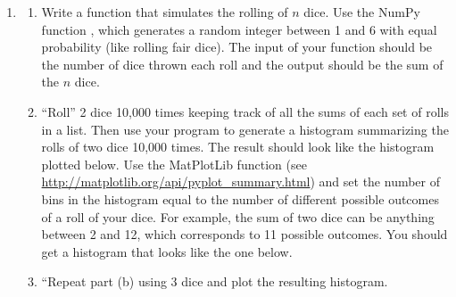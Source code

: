 \documentclass[letterpaper,10pt,english]{sphinxmanual}
\begin{document}
\begin{enumerate}
\item {} \begin{enumerate}
\item {} 
Write a function that simulates the rolling of \(n\) dice.  Use the NumPy function , which generates a random integer between 1 and 6 with equal probability (like rolling fair dice).  The input of your function should be the number of dice thrown each roll and the output should be the sum of the \(n\) dice.

\item {} 
``Roll'' 2 dice 10,000 times keeping track of all the sums of each set of rolls in a list.  Then use your program to generate a histogram  summarizing the rolls of two dice 10,000 times.  The result should look like the histogram plotted below.  Use the MatPlotLib function  (see \href{http://matplotlib.org/api/pyplot\_summary.html}{http://matplotlib.org/api/pyplot\_summary.html}) and set the number of bins in the histogram equal to the number of different possible outcomes of a roll of your dice.  For example, the sum of two dice can be anything between 2 and 12, which corresponds to 11 possible outcomes.  You should get a histogram that looks like the one below.

\item {} 
``Repeat part (b) using 3 dice and plot the resulting histogram.

\end{enumerate}
\begin{figure}[htbp]
\centering

\label{chap7/chap7_funcs:fig-dicerolln}\end{figure}


\end{enumerate}
\end{document}
